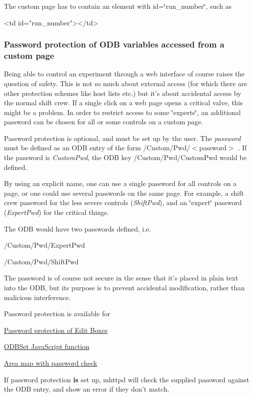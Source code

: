 The custom page has to contain an element with id=\char`\"{}run\_\-number\char`\"{}, such as 
\begin{DoxyCode}
  <td id="run_number"></td>
\end{DoxyCode}
 \par
\par
\hypertarget{RC_mhttpd_custom_ODB_access_features_RC_mhttpd_custom_pw_protection}{}\subsubsection{Password protection of ODB variables accessed from a custom page}\label{RC_mhttpd_custom_ODB_access_features_RC_mhttpd_custom_pw_protection}
Being able to control an experiment through a web interface of course raises the question of safety. This is not so much about external access (for which there are other protection schemes like host lists etc.) but it's about accidental access by the normal shift crew. If a single click on a web page opens a critical valve, this might be a problem. In order to restrict access to some \char`\"{}experts\char`\"{}, an additional password can be chosen for all or some controls on a custom page.

Password protection is optional, and must be set up by the user. The {\itshape password\/} must be defined as an ODB entry of the form  /Custom/Pwd/$<$password$>$ . If the password is {\itshape CustomPwd\/}, the ODB key /Custom/Pwd/CustomPwd  would be defined.

By using an explicit name, one can use a single password for all controls on a page, or one could use several passwords on the same page. For example, a shift crew password for the less severe controls ({\itshape ShiftPwd\/}), and an \char`\"{}expert\char`\"{} password ({\itshape ExpertPwd\/}) for the critical things.

The ODB would have two passwords defined, i.e.\par
  /Custom/Pwd/ExpertPwd\par
 /Custom/Pwd/ShiftPwd\par


The password is of course not secure in the sense that it's placed in plain text into the ODB, but its purpose is to prevent accidental modification, rather than malicious interference.

\par
 Password protection is available for
\begin{DoxyItemize}
\item \hyperlink{RC_mhttpd_Image_access_RC_mhttpd_custom_pw}{Password protection of Edit Boxes}
\item \hyperlink{RC_mhttpd_custom_ODB_access_RC_mhttpd_custom_odbset}{ODBSet JavaScript function}
\item \hyperlink{RC_mhttpd_Image_access_RC_mhttpd_custom_imagemap_pw}{Area map with password check}
\end{DoxyItemize}

If password protection {\bfseries is} set up, mhttpd will check the supplied password against the ODB entry, and show an error if they don't match.

\label{index_end}
\hypertarget{index_end}{}


 